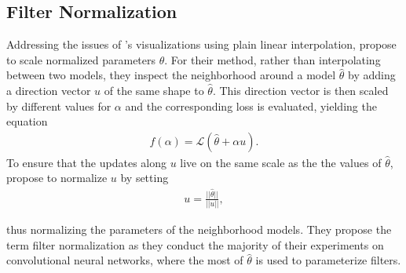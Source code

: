 \documentclass[a4paper]{scrartcl}
\begin{document}
\subsection*{Filter Normalization}
Addressing the issues of \citet{goodfellow2014qualitatively}'s visualizations using plain linear interpolation, \citet{li2017visualizing} propose to scale normalized parameters $\theta$. For their method, rather than interpolating between two models, they inspect the neighborhood around a model $\hat{\theta}$ by adding a direction vector $u$  of the same shape to $\hat{\theta}$. This direction vector is then scaled by different values for $\alpha$ and the corresponding loss is evaluated, yielding the equation
\begin{align*}
	f(\alpha) = \mathcal{L}(\hat{\theta} + \alpha u).
\end{align*}
To ensure that the updates along $u$ live on the same scale as the the values of $\hat{\theta}$, \citet{li2017visualizing} propose to normalize $u$ by setting
\begin{align}
	u = \frac{||\hat{\theta}||}{||u||},
\end{align}

thus normalizing the parameters of the neighborhood models. They propose the term filter normalization as they conduct the majority of their experiments on convolutional neural networks, where the most of $\hat{\theta}$ is used to parameterize filters.\\
\end{document}
